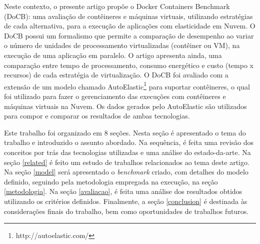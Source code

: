\documentclass[twoside,english,brazilian]{UNISINOSartigo}
\begin{document}

Neste contexto, o presente artigo propõe o Docker Containers Benchmark (DoCB): uma avaliação de contêineres e máquinas virtuais, utilizando estratégias de cada alternativa, para a execução de aplicações com elasticidade em Nuvem. O DoCB possui um formalismo que permite a comparação de desempenho ao variar o número de unidades de processamento virtualizadas (contêiner ou VM), na execução de uma aplicação em paralelo.
O artigo apresenta ainda, uma comparação entre tempo de processamento, consumo energético e custo (tempo x recursos) de cada estratégia de virtualização. O DoCB foi avaliado com a extensão de um modelo chamado AutoElastic\footnote{http://autoelastic.com/} para suportar contêineres, o qual foi utilizado para fazer o gerenciamento das execuções com contêineres e máquinas virtuais na Nuvem. Os dados gerados pelo AutoElastic são utilizados para compor e comparar os resultados de ambas tecnologias. 

Este trabalho foi organizado em 8 seções. Nesta seção é apresentado o tema do trabalho e introduzido o assunto abordado. Na sequência, é feita uma revisão dos conceitos por trás das tecnologias utilizadas e uma análise do estado-da-arte. Na seção \ref{related} é feito um estudo de trabalhos relacionados ao tema deste artigo. Na seção \ref{model} será apresentado o \textit{benchmark} criado, com detalhes do modelo definido, seguindo pela metodologia empregada na execução, na seção \ref{metodologia}. Na seção \ref{avaliacao}, é feita uma análise dos resultados obtidos utilizando os critérios definidos. Finalmente, a seção \ref{conclusion} é destinada às considerações finais do trabalho, bem como oportunidades de trabalhos futuros.
\end{document}
